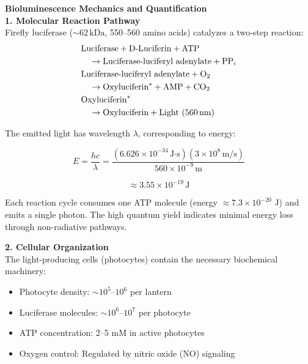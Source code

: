 \begin{technical}
{\Large\textbf{Bioluminescence Mechanics and Quantification}}\\[0.7em]

\noindent\textbf{1. Molecular Reaction Pathway}\\
Firefly luciferase ($\sim 62\,\text{kDa}$, 550–560 amino acids) catalyzes a two-step reaction:
\begin{align}
&\text{Luciferase} + \text{D-Luciferin} + \text{ATP} \notag\\
&\quad\rightarrow \text{Luciferase-luciferyl adenylate} + \text{PP}_i \notag\\
&\text{Luciferase-luciferyl adenylate} + \text{O}_2 \notag\\
&\quad\rightarrow \text{Oxyluciferin}^* + \text{AMP} + \text{CO}_2 \notag\\
&\text{Oxyluciferin}^* \notag\\
&\quad\rightarrow \text{Oxyluciferin} + \text{Light (560\,nm)}
\end{align}

The emitted light has wavelength $\lambda$, corresponding to energy:

\begin{equation}
E = \frac{hc}{\lambda} = 
\frac{(6.626 \times 10^{-34}\,\text{J·s}) (3 \times 10^8\,\text{m/s})}
{560 \times 10^{-9}\,\text{m}} 
\end{equation}

\begin{equation}
\approx 3.55 \times 10^{-19}\,\text{J}
\end{equation}

Each reaction cycle consumes one ATP molecule (energy $\approx 7.3 \times 10^{-20}$ J) and emits a single photon. The high quantum yield indicates minimal energy loss through non-radiative pathways.

\noindent\textbf{2. Cellular Organization}\\
The light-producing cells (photocytes) contain the necessary biochemical machinery:

\begin{itemize}
    \item Photocyte density: $\sim 10^5$–$10^6$ per lantern
    \item Luciferase molecules: $\sim 10^6$–$10^7$ per photocyte
    \item ATP concentration: 2–5 mM in active photocytes
    \item Oxygen control: Regulated by nitric oxide (NO) signaling
\end{itemize}


\end{technical}

